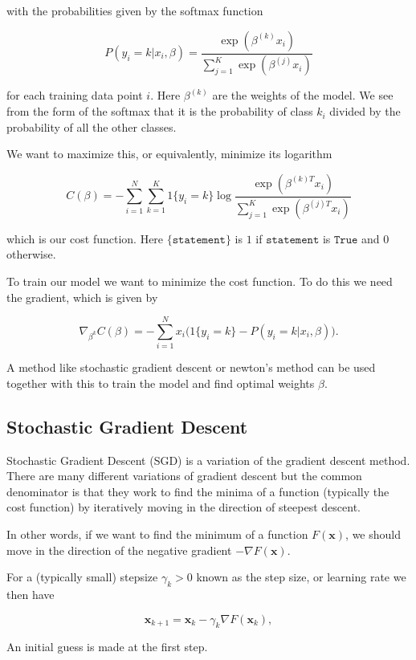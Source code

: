 \documentclass[11pt]{article}
\begin{document}
with the probabilities given by the softmax function

\[
P(y_i=k|x_i,\beta) = \frac{\exp(\beta^{(k)}x_i)}{\sum_{j=1}^K \exp(\beta^{(j)}x_i)}
\]

for each training data point \(i\). Here \(\beta^{(k)}\) are the weights
of the model. We see from the form of the softmax that it is the
probability of class \(k_i\) divided by the probability of all the other
classes.

We want to maximize this, or equivalently, minimize its logarithm

\[
C(\beta) = -\sum_{i=1}^N\sum_{k=1}^K 1\{y_i=k\}\log\frac{\exp(\beta^{(k)T}x_i)}{\sum_{j=1}^K \exp(\beta^{(j)T}x_i)}
\]

which is our cost function. Here \(\{\texttt{statement}\}\) is \(1\) if
\(\texttt{statement}\) is \(\texttt{True}\) and \(0\) otherwise.

To train our model we want to minimize the cost function. To do this we
need the gradient, which is given by

\[
\nabla_{\beta^k} C(\beta) = -\sum_{i=1}^Nx_i\bigg(1\{y_i=k\}-P(y_i=k|x_i,\beta)\bigg).
\]

A method like stochastic gradient descent or newton's method can be used
together with this to train the model and find optimal weights
\(\beta\).

    \hypertarget{stochastic-gradient-descent}{%
\subsection{Stochastic Gradient
Descent}\label{stochastic-gradient-descent}}

Stochastic Gradient Descent (SGD) is a variation of the gradient descent
method. There are many different variations of gradient descent but the
common denominator is that they work to find the minima of a function
(typically the cost function) by iteratively moving in the direction of
steepest descent.

In other words, if we want to find the minimum of a function
\(F(\mathbf{x})\), we should move in the direction of the negative
gradient \(-\nabla F(\mathbf{x})\).

For a (typically small) stepsize \(\gamma_k > 0\) known as the step
size, or learning rate we then have

\[
\mathbf{x}_{k+1} = \mathbf{x}_k - \gamma_k \nabla F(\mathbf{x}_k),
\]

An initial guess is made at the first step.
\end{document}
